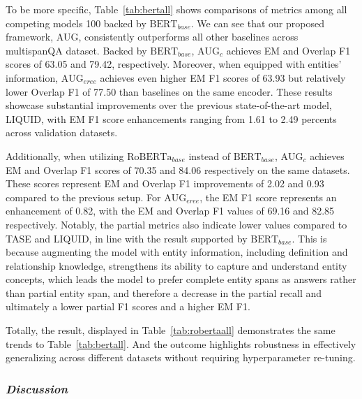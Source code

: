 \documentclass[mathematics,article,submit,moreauthors]{Definitions/mdpi}
\newcommand{\1}[1]{\mathds{1}\left[#1\right]}
\begin{document}
	To be more specific, Table~\ref{tab:bertall} shows comparisons of metrics among all competing models 100 backed by $\text{BERT}_{base}$. We can see that our proposed framework, AUG, consistently outperforms all other baselines across multispanQA dataset. Backed by $\text{BERT}_{base}$, $\text{AUG}_{c}$ achieves EM and Overlap F1 scores of 63.05 and 79.42, respectively. Moreover, when equipped with entities’ information,  $\text{AUG}_{eree}$ achieves even higher EM F1 scores of 63.93 but relatively lower Overlap F1 of 77.50 than baselines on the same encoder. These results showcase substantial improvements over the previous state-of-the-art model, LIQUID, with EM F1 score enhancements ranging from 1.61 to 2.49 percents across validation datasets. 
	
	Additionally, when utilizing $\text{RoBERTa}_{base}$ instead of $\text{BERT}_{base}$, $\text{AUG}_{c}$ achieves EM and Overlap F1 scores of 70.35 and 84.06 respectively on the same datasets. These scores represent EM and Overlap F1 improvements of 2.02 and 0.93 compared to the previous setup. For  $\text{AUG}_{eree}$, the EM F1 score represents an enhancement of 0.82, with the EM and Overlap F1 values of 69.16 and 82.85 respectively. Notably, the partial metrics also indicate lower values compared to TASE and LIQUID, in line with the result supported by $\text{BERT}_{base}$. This is because augmenting the model with entity information, including definition and relationship knowledge, strengthens its ability to capture and understand entity concepts, which leads the model to prefer complete entity spans as answers rather than partial entity span, and therefore a  decrease in the partial recall and ultimately a lower partial F1 scores and a higher EM F1.
	
	Totally, the result, displayed in Table~\ref{tab:robertaall} demonstrates the same trends to Table~\ref{tab:bertall}. And the outcome highlights robustness in effectively generalizing across different datasets without requiring hyperparameter re-tuning. 
	
\subsubsection{\textit{Discussion}}
\end{document}

